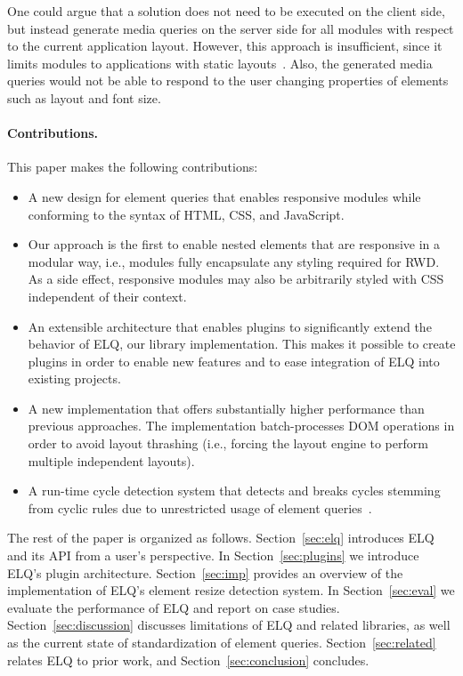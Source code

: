 \documentclass{llncs}
\newcommand{\elq}{ELQ}
\begin{document}
    One could argue that a solution does not need to be executed on the client side, but instead generate media queries on the server side for all modules with respect to the current application layout.
    However, this approach is insufficient, since it limits modules to applications with static layouts~\cite{elq-thesis}. Also, the generated media queries would not be able to respond to the user changing properties of elements such as layout and font size.

  \paragraph{Contributions.}
    This paper makes the following contributions:
    \begin{itemize}
      \item A new design for element queries that enables responsive modules while conforming to the syntax of HTML, CSS, and JavaScript.
      \item
        Our approach is the first to enable nested elements that are responsive in a modular way, i.e., modules fully encapsulate any styling required for RWD.
        As a side effect, responsive modules may also be arbitrarily styled with CSS independent of their context.
      \item
        An extensible architecture that enables plugins to significantly extend the behavior of ELQ, our library implementation.
        This makes it possible to create plugins in order to enable new features and to ease integration of \elq{} into existing projects.
      \item
        A new implementation that offers substantially higher performance than previous approaches.
        The implementation batch-processes DOM operations in order to avoid layout thrashing (i.e., forcing the layout engine to perform multiple independent layouts).
      \item
        A run-time cycle detection system that detects and breaks cycles stemming from cyclic rules due to unrestricted usage of element queries~\cite{elq-thesis}.
    \end{itemize}

  \noindent
  The rest of the paper is organized as follows.
  Section~\ref{sec:elq} introduces \elq{} and its API from a user's perspective.
  In Section~\ref{sec:plugins} we introduce \elq{}'s plugin architecture.
  Section~\ref{sec:imp} provides an overview of the implementation of \elq{}'s element resize detection system.
  In Section~\ref{sec:eval} we evaluate the performance of \elq{} and report on case studies.
  Section~\ref{sec:discussion} discusses limitations of \elq{} and related libraries, as well as the current state of standardization of element queries.
  Section~\ref{sec:related} relates \elq{} to prior work, and Section~\ref{sec:conclusion} concludes.
\end{document}
